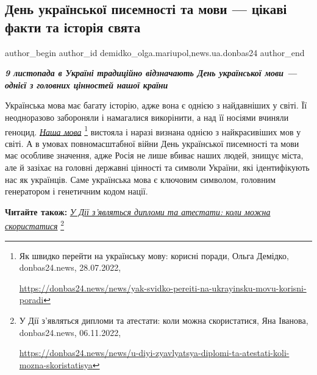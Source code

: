  
 
 
 
 
 
\subsection{День української писемності та мови — цікаві факти та історія свята}
\label{sec:09_11_2022.stz.news.ua.donbas24.2.den_ukr_pysemnosti_movy_fakty_istoria}
 
\ifcmt
 author_begin
   author_id demidko_olga.mariupol,news.ua.donbas24
 author_end
\fi

\begin{center}
  \em\color{blue}\bfseries\Large
9 листопада в Україні традиційно відзначають День української мови — однієї з головних цінностей нашої країни
\end{center}

Українська мова має багату історію, адже вона є однією з найдавніших у світі.
Її неодноразово забороняли і намагалися викорінити, а над її носіями вчиняли
геноцид. \href{https://donbas24.news/news/yak-svidko-pereiti-na-ukrayinsku-movu-korisni-poradi}{\emph{Наша мова}}%
\footnote{Як швидко перейти на українську мову: корисні поради, Ольга Демідко, donbas24.news, 28.07.2022, \par\url{https://donbas24.news/news/yak-svidko-pereiti-na-ukrayinsku-movu-korisni-poradi}} вистояла і наразі визнана однією з найкрасивіших мов у
світі. А в умовах повномасштабної війни День української писемності та мови має
особливе значення, адже Росія не лише вбиває наших людей, знищує міста, але й
зазіхає на головні державні цінності та символи України, які ідентифікують нас
як українців. Саме українська мова є ключовим символом, головним генератором і
генетичним кодом нації.

\textbf{Читайте також:} \href{https://donbas24.news/news/u-diyi-zyavlyatsya-diplomi-ta-atestati-koli-mozna-skoristatisya}{\emph{У Дії з'являться дипломи та атестати: коли можна скористатися}}%
\footnote{У Дії з'являться дипломи та атестати: коли можна скористатися, Яна Іванова, donbas24.news, 06.11.2022, \par%
\url{https://donbas24.news/news/u-diyi-zyavlyatsya-diplomi-ta-atestati-koli-mozna-skoristatisya}%
}

